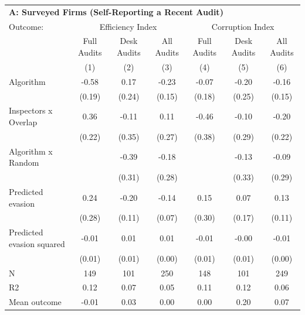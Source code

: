\begin{tabular}{lccc|ccc} \toprule
\multicolumn{7}{l}{\textbf{A: Surveyed Firms (Self-Reporting a Recent Audit)}} \\ \multicolumn{1}{l}{Outcome:} & \multicolumn{3}{c}{Efficiency Index} & \multicolumn{3}{c}{Corruption Index} \\ \multicolumn{1}{l}{} & Full Audits & Desk Audits & All Audits & Full Audits & Desk Audits & All Audits \\ \multicolumn{1}{l}{} & (1) & (2) & (3) & (4) & (5) & (6) \\ \midrule
Algorithm   &       -0.58\sym{***}&        0.17         &       -0.23         &       -0.07         &       -0.20         &       -0.16         \\
            &      (0.19)         &      (0.24)         &      (0.15)         &      (0.18)         &      (0.25)         &      (0.15)         \\
\addlinespace
Inspectors x Overlap&        0.36         &       -0.11         &        0.11         &       -0.46         &       -0.10         &       -0.20         \\
            &      (0.22)         &      (0.35)         &      (0.27)         &      (0.38)         &      (0.29)         &      (0.22)         \\
\addlinespace
Algorithm x Random&                     &       -0.39         &       -0.18         &                     &       -0.13         &       -0.09         \\
            &                     &      (0.31)         &      (0.28)         &                     &      (0.33)         &      (0.29)         \\
\addlinespace
Predicted evasion&        0.24         &       -0.20\sym{*}  &       -0.14\sym{*}  &        0.15         &        0.07         &        0.13         \\
            &      (0.28)         &      (0.11)         &      (0.07)         &      (0.30)         &      (0.17)         &      (0.11)         \\
\addlinespace
Predicted evasion squared&       -0.01         &        0.01\sym{*}  &        0.01\sym{*}  &       -0.01         &       -0.00         &       -0.01         \\
            &      (0.01)         &      (0.01)         &      (0.00)         &      (0.01)         &      (0.01)         &      (0.00)         \\
\midrule
N           &         149         &         101         &         250         &         148         &         101         &         249         \\
R2          &        0.12         &        0.07         &        0.05         &        0.11         &        0.12         &        0.06         \\
Mean outcome&       -0.01         &        0.03         &        0.00         &        0.00         &        0.20         &        0.07         \\


\end{tabular}
